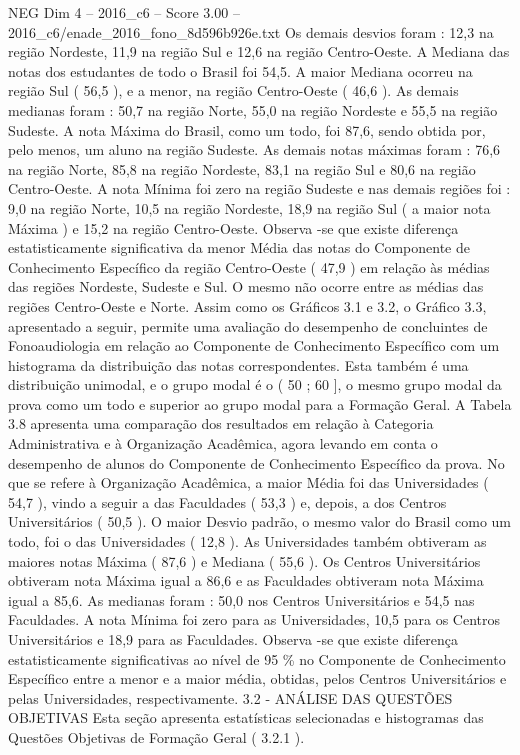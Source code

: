 \begin{textsample}{NEG Dim 4 – 2016\_c6 – Score 3.00 – 2016\_c6/enade\_2016\_fono\_8d596b926e.txt}
Os demais desvios foram : 12,3 na região Nordeste, 11,9 na região Sul e 12,6 na região Centro-Oeste.
A Mediana das notas dos estudantes de todo o Brasil foi 54,5.
A maior Mediana ocorreu na região Sul ( 56,5 ), e a menor, na região Centro-Oeste ( 46,6 ).
As demais medianas foram : 50,7 na região Norte, 55,0 na região Nordeste e 55,5 na região Sudeste.
A nota Máxima do Brasil, como um todo, foi 87,6, sendo obtida por, pelo menos, um aluno na região Sudeste.
As demais notas máximas foram : 76,6 na região Norte, 85,8 na região Nordeste, 83,1 na região Sul e 80,6 na região Centro-Oeste.
A nota Mínima foi zero na região Sudeste e nas demais regiões foi : 9,0 na região Norte, 10,5 na região Nordeste, 18,9 na região Sul ( a maior nota Máxima ) e 15,2 na região Centro-Oeste.
Observa -se que existe diferença estatisticamente significativa da menor Média das notas do Componente de Conhecimento Específico da região Centro-Oeste ( 47,9 ) em relação às médias das regiões Nordeste, Sudeste e Sul.
O mesmo não ocorre entre as médias das regiões Centro-Oeste e Norte.
Assim como os Gráficos 3.1 e 3.2, o Gráfico 3.3, apresentado a seguir, permite uma avaliação do desempenho de concluintes de Fonoaudiologia em relação ao Componente de Conhecimento Específico com um histograma da distribuição das notas correspondentes.
Esta também é uma distribuição unimodal, e o grupo modal é o ( 50 ; 60 ], o mesmo grupo modal da prova como um todo e superior ao grupo modal para a Formação Geral.
A Tabela 3.8 apresenta uma comparação dos resultados em relação à Categoria Administrativa e à Organização Acadêmica, agora levando em conta o desempenho de alunos do Componente de Conhecimento Específico da prova.
No que se refere à Organização Acadêmica, a maior Média foi das Universidades ( 54,7 ), vindo a seguir a das Faculdades ( 53,3 ) e, depois, a dos Centros Universitários ( 50,5 ).
O maior Desvio padrão, o mesmo valor do Brasil como um todo, foi o das Universidades ( 12,8 ).
As Universidades também obtiveram as maiores notas Máxima ( 87,6 ) e Mediana ( 55,6 ).
Os Centros Universitários obtiveram nota Máxima igual a 86,6 e as Faculdades obtiveram nota Máxima igual a 85,6.
As medianas foram : 50,0 nos Centros Universitários e 54,5 nas Faculdades.
A nota Mínima foi zero para as Universidades, 10,5 para os Centros Universitários e 18,9 para as Faculdades.
Observa -se que existe diferença estatisticamente significativas ao nível de 95 \% no Componente de Conhecimento Específico entre a menor e a maior média, obtidas, pelos Centros Universitários e pelas Universidades, respectivamente. 3.2 - ANÁLISE DAS QUESTÕES OBJETIVAS Esta seção apresenta estatísticas selecionadas e histogramas das Questões Objetivas de Formação Geral ( 3.2.1 ).

\end{textsample}
